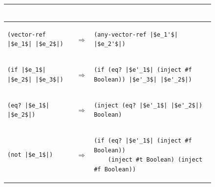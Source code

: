 \documentclass[7x10,nocrop]{TimesAPriori_MIT}%
\begin{document}
\begin{figure}[btp]
{\begin{tabular}{|lll|}
\begin{minipage}{0.65\textwidth}
\begin{lstlisting}
\end{lstlisting}
\end{minipage}
\\[2ex]\hline
\begin{minipage}{0.27\textwidth}
\begin{lstlisting}
(vector-ref |$e_1$| |$e_2$|)
\end{lstlisting}
\end{minipage}
&
$\Rightarrow$
&
\begin{minipage}{0.65\textwidth}
\begin{lstlisting}
(any-vector-ref |$e_1'$| |$e_2'$|)
\end{lstlisting}
\end{minipage}
\\[2ex]\hline
\begin{minipage}{0.27\textwidth}
\begin{lstlisting}
(if |$e_1$| |$e_2$| |$e_3$|)
\end{lstlisting}
\end{minipage}
&
$\Rightarrow$
&
\begin{minipage}{0.65\textwidth}
\begin{lstlisting}
(if (eq? |$e'_1$| (inject #f Boolean)) |$e'_3$| |$e'_2$|)
\end{lstlisting}
\end{minipage}
\\[2ex]\hline
\begin{minipage}{0.27\textwidth}
\begin{lstlisting}
(eq? |$e_1$| |$e_2$|)
\end{lstlisting}
\end{minipage}
&
$\Rightarrow$
&
\begin{minipage}{0.65\textwidth}
\begin{lstlisting}
(inject (eq? |$e'_1$| |$e'_2$|) Boolean)
\end{lstlisting}
\end{minipage}
\\[2ex]\hline
\begin{minipage}{0.27\textwidth}
\begin{lstlisting}
(not |$e_1$|)
\end{lstlisting}
\end{minipage}
&
$\Rightarrow$
&
\begin{minipage}{0.65\textwidth}
\begin{lstlisting}
(if (eq? |$e'_1$| (inject #f Boolean))
    (inject #t Boolean) (inject #f Boolean))
\end{lstlisting}

\end{minipage}
\end{tabular}}
\end{figure}
\end{document}

